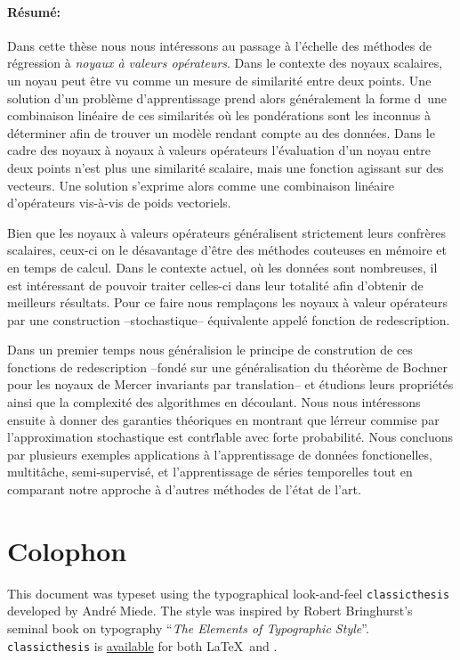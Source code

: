 \paragraph{R\'esum\'e:} Dans cette th\`ese nous nous int\'eressons au passage \`a l'\'echelle des m\'ethodes de r\'egression \`a \emph{noyaux \`a valeurs op\'erateurs}. Dans le contexte des noyaux scalaires, un noyau peut \^etre vu comme un mesure de similarit\'e entre deux points. Une solution d'un probl\`eme d'apprentissage prend alors g\'en\'eralement la forme d\ une combinaison lin\'eaire de ces similarit\'es o\`u les pond\'erations sont les inconnus \`a d\'eterminer afin de trouver un mod\`ele rendant compte au  des donn\'ees. Dans le cadre des noyaux \`a noyaux \`a valeurs op\'erateurs l'\'evaluation d'un noyau entre deux points n'est plus une similarit\'e scalaire, mais une fonction agissant sur des vecteurs. Une solution s'exprime alors comme une combinaison lin\'eaire d'op\'erateurs vis-\`a-vis de poids vectoriels.

Bien que les noyaux \`a valeurs op\'erateurs g\'en\'eralisent strictement leurs confr\`eres sca\-lai\-res, ceux-ci on le d\'esavantage d'\^etre des m\'ethodes couteuses en m\'emoire et en temps de calcul. Dans le contexte actuel, o\`u les donn\'ees sont nombreuses, il est int\'eressant de pouvoir traiter celles-ci dans leur totalit\'e afin d'obtenir de meilleurs r\'esultats. Pour ce faire nous rempla\c cons les noyaux \`a valeur op\'erateurs par une construction --stochastique-- \'equivalente appel\'e fonction de redescription.

Dans un premier temps nous g\'en\'eralision le principe de constrution de ces fonctions de redescription --fond\'e sur une g\'en\'eralisation du th\'eor\`eme de Bochner pour les noyaux de Mercer invariants par translation-- et \'etudions leurs propri\'et\'es ainsi que la complexit\'e des algorithmes en d\'ecoulant. Nous nous int\'eressons ensuite \`a donner des garanties th\'eoriques en montrant que l\'erreur commise par l'approximation stochastique est contr\^lable avec forte probabilit\'e. Nous concluons par plusieurs exemples applications \`a l'apprentissage de donn\'ees fonctionelles, multit\^ache, semi-supervis\'e, et l'apprentissage de s\'eries temporelles tout en comparant notre approche \`a d'autres m\'ethodes de l'\'etat de l'art.

\section*{Colophon}
This document was typeset using the typographical look-and-feel \texttt{cla\-ssic\-the\-sis} developed by Andr\'e Miede. The style was inspired by Robert Bringhurst's seminal book on typography ``\emph{The Elements of Typographic Style}''. \texttt{cla\-ssic\-the\-sis} is \href{https://bitbucket.org/amiede/classicthesis/}{available} for both \LaTeX\ and \mLyX.

\bigskip

\noindent\finalVersionString
